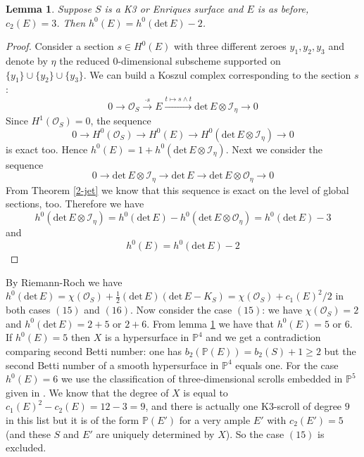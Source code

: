 \documentclass[a4paper]{amsart}
\theoremstyle{plain}
\newtheorem{lemma}[theorem]{Lemma}
\theoremstyle{definition}
\begin{document}
\begin{lemma}
    \label{k3}
    Suppose $S$ is a K3 or Enriques surface and $E$ is as before, $c_2(E) = 3$. Then $h^0(E) = h^0(\mathrm{det}\, E) - 2$.
\end{lemma}
\begin{proof}
    Consider a section $s \in H^0(E)$ with three different zeroes $y_1, y_2, y_3$ and denote by $\eta$ the reduced $0$-dimensional subscheme supported on $\{y_1\} \cup \{y_2\} \cup \{y_3\}$.
    We can build a Koszul complex corresponding to the section $s$:
    \[
    0 \longrightarrow \mathcal O_S \stackrel{\cdot s}{\longrightarrow} E \stackrel {t \mapsto s \wedge t}{\longrightarrow} \mathrm{det}\, E \otimes \mathcal I_{\eta}  \longrightarrow 0
    \]
    Since $H^1(\mathcal O_S) = 0$, the sequence
    \[
    0 \longrightarrow H^0(\mathcal O_S) \longrightarrow H^0(E) \longrightarrow H^0(\mathrm{det}\, E \otimes \mathcal I_{\eta})  \longrightarrow 0
    \]
    is exact too. Hence $h^0(E) = 1 + h^0(\mathrm{det}\, E \otimes \mathcal I_{\eta})$.
    Next we consider the sequence
    \[
    0 \longrightarrow \mathrm{det}\, E \otimes \mathcal I_{\eta} \longrightarrow \mathrm{det}\, E \longrightarrow \mathrm{det}\, E \otimes \mathcal O_{\eta} \longrightarrow 0
    \]
    From Theorem \ref{2-jet} we know that this sequence is exact on the level of global sections, too.
    Therefore we have 
    \[
    h^0(\mathrm{det}\, E \otimes \mathcal I_{\eta}) = h^0(\mathrm{det}\, E) - h^0(\mathrm{det}\, E \otimes \mathcal O_{\eta}) = h^0(\mathrm{det}\, E) - 3
    \]
    and
    \[
    h^0(E) = h^0(\mathrm{det}\, E) - 2
    \]
\end{proof}
By Riemann-Roch we have $h^0(\mathrm{det}\, E) = \chi(\mathcal O_S) + \frac{1}{2} (\mathrm{det}\, E)(\mathrm{det}\, E - K_S) = \chi(\mathcal O_S) + c_1(E)^2/2$ in both cases $(15)$ and $(16)$.
Now consider the case $(15)$: we have $\chi(\mathcal O_S) = 2$ and $h^0(\mathrm{det}\, E) = 2+5$ or $2+6$.
From lemma \ref{k3} we have that $h^0(E) = 5$ or $6$. If $h^0(E) = 5$ then $X$ is a hypersurface in $\mathbb P^4$ and we get a contradiction comparing second Betti number:
one has $b_2(\mathbb P(E)) = b_2(S) + 1 \geq 2$ but the second Betti number of a smooth hypersurface in $\mathbb P^4$ equals one.
For the case $h^0(E) = 6$ we use the classification of three-dimensional scrolls embedded in $\mathbb P^5$ given in \cite{Ottaviani}.
We know that the degree of $X$ is equal to $c_1(E)^2 - c_2(E) = 12 - 3 = 9$, and there is actually one K3-scroll of degree $9$ in this list but it is of the form
$\mathbb P(E')$ for a very ample $E'$ with $c_2(E') = 5$ (and these $S$ and $E'$ are uniquely determined by $X$).
So the case $(15)$ is excluded.
\end{document}
